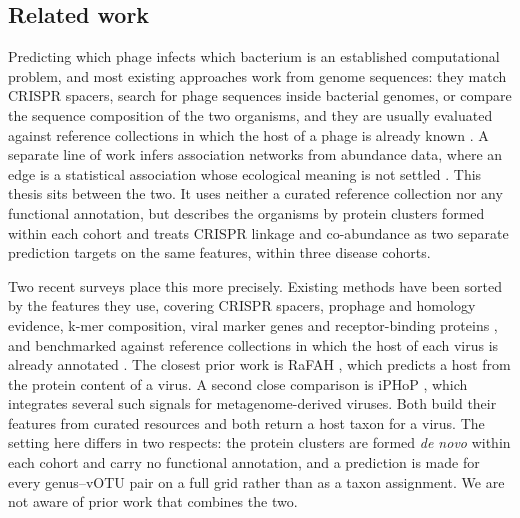 \subsection{Related work}
Predicting which phage infects which bacterium is an established computational problem, and most existing 
approaches work from genome sequences: they match CRISPR spacers, search for phage sequences inside bacterial 
genomes, or compare the sequence composition of the two organisms, and they are usually evaluated against 
reference collections in which the host of a phage is already known \citep{edwards2016}. A separate line 
of work infers association networks from abundance data, where an edge is a statistical association whose 
ecological meaning is not settled \citep{friedman2008,liu2010}. This thesis sits between the two. It uses 
neither a curated reference collection nor any functional annotation, but describes the organisms by protein 
clusters formed within each cohort and treats CRISPR linkage and co-abundance as two separate prediction targets on the same features, 
within three disease cohorts.

Two recent surveys place this more precisely. Existing methods have been sorted by the features they use,
covering CRISPR spacers, prophage and homology evidence, k-mer composition, viral marker genes and
receptor-binding proteins \citep{nie2024}, and benchmarked against reference collections in which the host of
each virus is already annotated \citep{shang2025}. The closest prior work is RaFAH \citep{coutinho2021}, which 
predicts a host from the protein content of a virus. A second close comparison is iPHoP \citep{roux2023}, which
integrates several such signals for metagenome-derived viruses. Both build their features from curated resources and both return a host taxon
for a virus. The setting here differs in two respects: the protein clusters are formed \emph{de novo} within
each cohort and carry no functional annotation, and a prediction is made for every genus--vOTU pair on a full
grid rather than as a taxon assignment. We are not aware of prior work that combines the two.